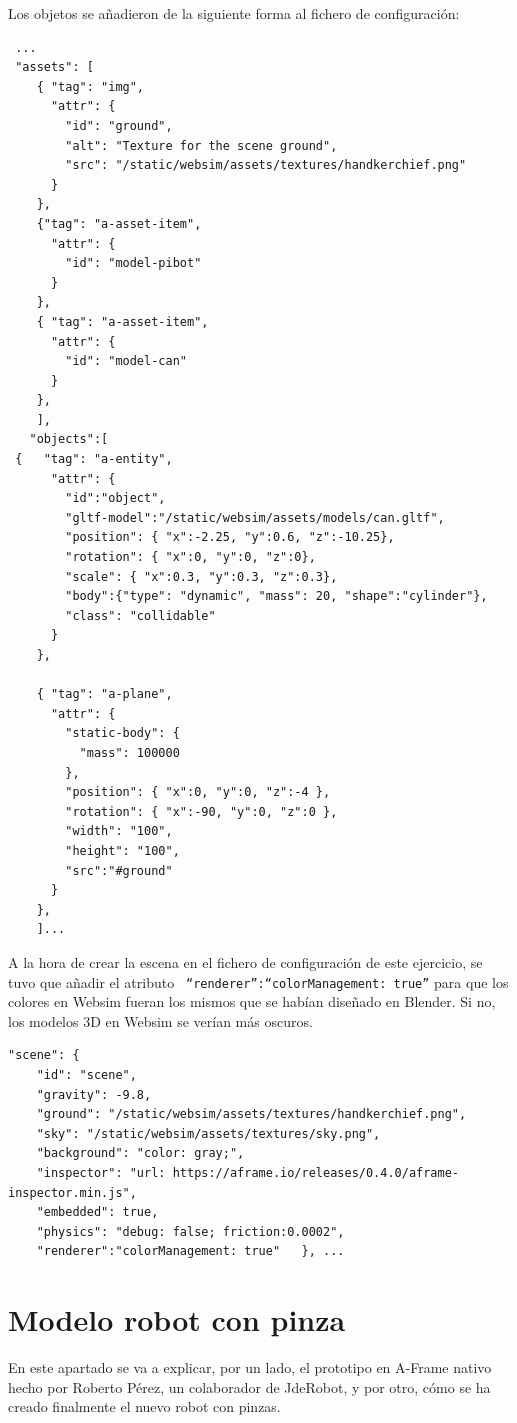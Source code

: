  
Los objetos se añadieron de la siguiente forma al fichero de configuración:
\\
\begin{lstlisting}
 ...
 "assets": [
    { "tag": "img",
      "attr": {
        "id": "ground",
        "alt": "Texture for the scene ground",
        "src": "/static/websim/assets/textures/handkerchief.png"
      }
    },
    {"tag": "a-asset-item",
      "attr": {
        "id": "model-pibot"
      }
    },
    { "tag": "a-asset-item",
      "attr": {
        "id": "model-can"
      }
    },
    ],
   "objects":[
 {   "tag": "a-entity",
      "attr": {
        "id":"object",
        "gltf-model":"/static/websim/assets/models/can.gltf",
        "position": { "x":-2.25, "y":0.6, "z":-10.25},
        "rotation": { "x":0, "y":0, "z":0},
        "scale": { "x":0.3, "y":0.3, "z":0.3},
        "body":{"type": "dynamic", "mass": 20, "shape":"cylinder"},
        "class": "collidable"
      }
    },
    
    { "tag": "a-plane",
      "attr": {
        "static-body": {
          "mass": 100000
        },
        "position": { "x":0, "y":0, "z":-4 },
        "rotation": { "x":-90, "y":0, "z":0 },
        "width": "100",
        "height": "100",
        "src":"#ground"
      }
    },
    ]...
 \end{lstlisting}

A la hora de crear la escena en el fichero de configuración de este ejercicio, se tuvo que añadir el atributo
\texttt{ ``renderer'':``colorManagement: true''} para que los colores en Websim fueran los mismos que se habían diseñado en Blender. Si no, los modelos 3D en Websim se verían más oscuros. 

\begin{lstlisting}
"scene": {
    "id": "scene",
    "gravity": -9.8,
    "ground": "/static/websim/assets/textures/handkerchief.png",
    "sky": "/static/websim/assets/textures/sky.png",
    "background": "color: gray;",
    "inspector": "url: https://aframe.io/releases/0.4.0/aframe-inspector.min.js",
    "embedded": true,
    "physics": "debug: false; friction:0.0002",
    "renderer":"colorManagement: true"   }, ...
 \end{lstlisting}

\section{Modelo robot con pinza}
En este apartado se va a explicar,  por un lado, el prototipo en A-Frame nativo hecho por Roberto Pérez, un colaborador de JdeRobot, y por otro, cómo se ha creado finalmente el nuevo robot con pinzas.


